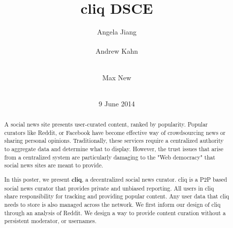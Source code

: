\documentclass{sig-alternate}
\begin{document}
\nocite{*}


\title{cliq DSCE}


\author{
\alignauthor Angela Jiang\\
  \\
\alignauthor Andrew Kahn\\
  \\
\and
\alignauthor Max New\\
  \\
}

\date{9 June 2014}

\maketitle
\begin{abstract}
A social news site presents user-curated content, ranked by popularity. Popular 
curators like Reddit, or Facebook have become effective way of crowdsourcing 
news or sharing personal opinions. Traditionally, these services require a 
centralized authority to aggregate data and determine what to display. However, 
the trust issues that arise from a centralized system are particularly damaging to 
the "Web democracy" that social news sites are meant to provide. 

In this poster, we present {\bf cliq}, a decentralized social news curator. cliq is a P2P based 
social news curator that provides private and unbiased reporting. All users in cliq share 
responsibility for tracking and providing popular content. Any user data that cliq needs 
to store is also managed across the network. We first inform our design of cliq through 
an analysis of Reddit. We design a way to provide content curation without a persistent 
moderator, or usernames.
\end{abstract}
\end{document}
